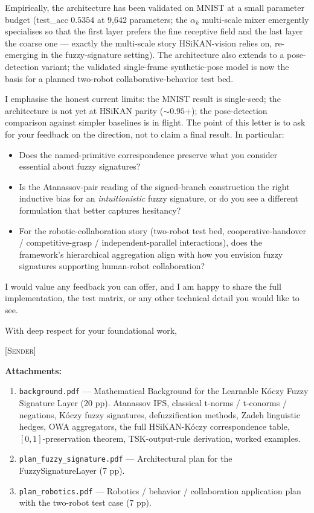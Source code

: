 \documentclass[11pt]{article}
\begin{document}
Empirically, the architecture has been validated on MNIST at a small
parameter budget (test\_acc $0.5354$ at 9{,}642 parameters; the
$\alpha_k$ multi-scale mixer emergently specialises so that the
first layer prefers the fine receptive field and the last layer the
coarse one — exactly the multi-scale story HSiKAN-vision relies on,
re-emerging in the fuzzy-signature setting). The architecture also
extends to a pose-detection variant; the validated single-frame
synthetic-pose model is now the basis for a planned two-robot
collaborative-behavior test bed.

I emphasise the honest current limits: the MNIST result is
single-seed; the architecture is not yet at HSiKAN parity ($\sim 0.95$+);
the pose-detection comparison against simpler baselines is in flight.
The point of this letter is to ask for your feedback on the
direction, not to claim a final result. In particular:

\begin{itemize}
  \item Does the named-primitive correspondence preserve what you
        consider essential about fuzzy signatures?
  \item Is the Atanassov-pair reading of the signed-branch
        construction the right inductive bias for an
        \emph{intuitionistic} fuzzy signature, or do you see a
        different formulation that better captures hesitancy?
  \item For the robotic-collaboration story (two-robot test bed,
        cooperative-handover / competitive-grasp / independent-parallel
        interactions), does the framework's hierarchical aggregation
        align with how you envision fuzzy signatures supporting
        human-robot collaboration?
\end{itemize}

I would value any feedback you can offer, and I am happy to share
the full implementation, the test matrix, or any other technical
detail you would like to see.

With deep respect for your foundational work,

\bigskip

\noindent\textsc{[Sender]}

\bigskip

\noindent\textbf{Attachments:}
\begin{enumerate}
  \item \texttt{background.pdf} — Mathematical Background for the
        Learnable Kóczy Fuzzy Signature Layer (20 pp). Atanassov
        IFS, classical t-norms / t-conorms / negations, Kóczy
        fuzzy signatures, defuzzification methods, Zadeh
        linguistic hedges, OWA aggregators, the full HSiKAN-Kóczy
        correspondence table, $[0,1]$-preservation theorem,
        TSK-output-rule derivation, worked examples.
  \item \texttt{plan\_fuzzy\_signature.pdf} — Architectural plan
        for the FuzzySignatureLayer (7 pp).
  \item \texttt{plan\_robotics.pdf} — Robotics / behavior /
        collaboration application plan with the two-robot test
        case (7 pp).
\end{enumerate}
\end{document}
